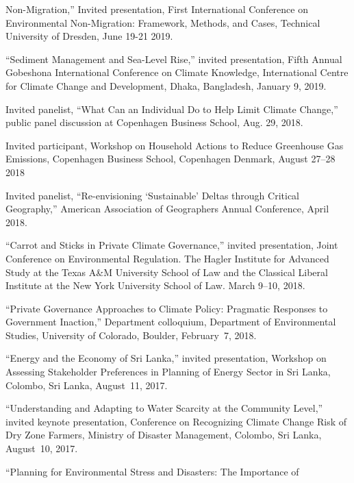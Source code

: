  Non-Migration,'' Invited presentation, First International Conference on
 Environmental Non-Migration: Framework, Methods, and Cases, Technical
 University of Dresden, June 19-21 2019.
\item ``Sediment Management and Sea-Level Rise,'' invited presentation, Fifth
  Annual Gobeshona International Conference on Climate Knowledge, International
  Centre for Climate Change and Development, Dhaka, Bangladesh, January 9, 2019.
\item Invited panelist, ``What Can an Individual Do to Help Limit Climate
  Change,'' public panel discussion at Copenhagen Business School, Aug. 29,
  2018.
\item Invited participant, Workshop on Household Actions to Reduce Greenhouse
  Gas Emissions, Copenhagen Business School, Copenhagen Denmark, August 27--28
  2018
\item Invited panelist, ``Re-envisioning `Sustainable' Deltas through Critical
  Geography,'' American Association of Geographers Annual Conference, April
  2018.
\item ``Carrot and Sticks in Private Climate Governance,'' invited
  presentation, Joint Conference on Environmental Regulation. The Hagler
  Institute for Advanced Study at the Texas A\&M University School of Law and
  the Classical Liberal Institute at the New York University School of Law.
  March 9--10, 2018.
\item ``Private Governance Approaches to Climate Policy: Pragmatic Responses to
  Government Inaction,'' Department colloquium, Department of Environmental
  Studies, University of Colorado, Boulder, February~7, 2018.
\item ``Energy and the Economy of Sri Lanka,'' invited presentation, Workshop
  on Assessing Stakeholder Preferences in Planning of Energy Sector in Sri
  Lanka, Colombo, Sri Lanka, August~11, 2017.
\item ``Understanding and Adapting to Water Scarcity at the Community Level,''
  invited keynote presentation, Conference on Recognizing Climate Change Risk
  of Dry Zone Farmers, Ministry of Disaster Management, Colombo, Sri Lanka,
  August~10, 2017.
\item ``Planning for Environmental Stress and Disasters: The Importance of
